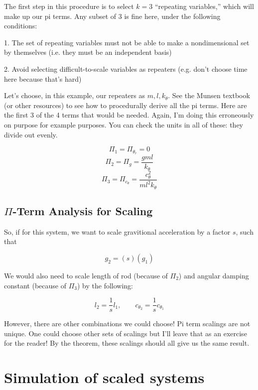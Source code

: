 \documentclass[12pt,letterpaper]{article}
\begin{document}
The first step in this procedure is to select $k=3$ ``repeating variables,'' which will make up our pi terms. Any subset of 3 is fine here, under the following conditions:

1. The set of repeating variables must not be able to make a nondimensional set by themselves (i.e. they must be an independent basis)

2. Avoid selecting difficult-to-scale variables as repeaters (e.g. don't choose time here because that's hard)


Let's choose, in this example, our repeaters as $m, l, k_{\theta}$. See the Munsen textbook (or other resources) to see how to procedurally derive all the pi terms. 
Here are the first 3 of the 4 terms that would be needed.
Again, I'm doing this erroneously on purpose for example purposes.
You can check the units in all of these: they divide out evenly.

\[
\Pi_1 = \Pi_{\theta_r} = 0
\]
\[
\Pi_2 = \Pi_{g} = \frac{gml}{k_{\theta}}
\]
\[
\Pi_3 = \Pi_{c_{\theta}} = \frac{c_{\theta}^2 }{m l^2 k_{\theta}}
\]

\subsection{$\Pi$-Term Analysis for Scaling}

So, if for this system, we want to scale gravitional acceleration by a factor $s$, such that

\[
g_2 = (s) (g_1)
\]

We would also need to scale length of rod (because of $\Pi_2$) and angular damping constant (because of $\Pi_3$) by the following:

\[
l_2 = \frac{1}{s} l_1, \quad \quad c_{\theta_2} = \frac{1}{s} c_{\theta_1}
\]

However, there are other combinations we could choose! 
Pi term scalings are not unique.
One could choose other sets of scalings but I'll leave that as an exercise for the reader!
By the theorem, these scalings should all give us the same result.



\section{Simulation of scaled systems}
\end{document}
